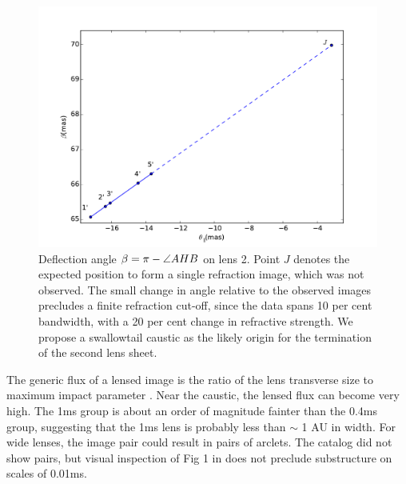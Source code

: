\documentclass[useAMS,usenatbib]{mn2e}
\begin{document}
\begin{figure}
\centering
\includegraphics[width=1.0\linewidth]{Reflection_angle.pdf}
\caption{Deflection angle $\beta=\pi-\protect\angle AHB$ on lens 2.  Point $J$ denotes the expected position to form a single refraction image, which was not
  observed.   The small change in angle relative to the observed
  images precludes a finite refraction cut-off, since the data spans
  10 per cent bandwidth, with a 20 per cent change in refractive strength.  We
  propose a swallowtail caustic as the likely origin for the
  termination of the second lens sheet.
}
\label{vtrans}
\end{figure}

The generic flux of a lensed image is the ratio of the lens transverse
size to maximum impact parameter \citep{2012MNRAS.421L.132P}.  Near
the caustic, the lensed flux can become very high.  The 1ms group is
about an order of magnitude fainter than the 0.4ms group, suggesting
that the 1ms lens is probably less than $\sim$ 1 AU in width.  
For wide lenses, the image pair could result in pairs of arclets.  The
catalog did not show pairs, but visual inspection of Fig 1 in
\citet{2010ApJ...708..232B} does not preclude substructure on scales
of 0.01ms.
\end{document}
